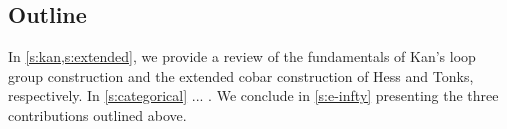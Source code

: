 
\subsection*{Outline}

In \cref{s:kan,s:extended}, we provide a review of the fundamentals of Kan's loop group construction and the extended cobar construction of Hess and Tonks, respectively.
In \cref{s:categorical} ... .
We conclude in \cref{s:e-infty} presenting the three contributions outlined above.